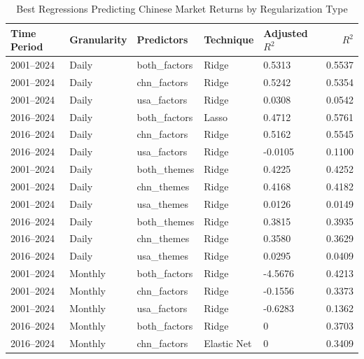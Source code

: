 \begin{table}[htbp]
\centering
\caption{Best Regressions Predicting Chinese Market Returns by Regularization Type}
\label{tab:chn_market_regularized_regression_summary}
\begin{tabular}{@{}lllllr@{}}
\toprule
Time Period & Granularity & Predictors     & Technique & Adjusted $R^2$ & $R^2$ \\ \midrule
2001--2024  & Daily       & both\_factors  & Ridge          & 0.5313         & 0.5537 \\
2001--2024  & Daily       & chn\_factors   & Ridge          & 0.5242         & 0.5354 \\
2001--2024  & Daily       & usa\_factors   & Ridge          & 0.0308         & 0.0542 \\
2016--2024  & Daily       & both\_factors  & Lasso          & 0.4712         & 0.5761 \\
2016--2024  & Daily       & chn\_factors   & Ridge          & 0.5162         & 0.5545 \\
2016--2024  & Daily       & usa\_factors   & Ridge          & -0.0105        & 0.1100 \\
2001--2024  & Daily       & both\_themes   & Ridge          & 0.4225         & 0.4252 \\
2001--2024  & Daily       & chn\_themes    & Ridge          & 0.4168         & 0.4182 \\
2001--2024  & Daily       & usa\_themes    & Ridge          & 0.0126         & 0.0149 \\
2016--2024  & Daily       & both\_themes   & Ridge          & 0.3815         & 0.3935 \\
2016--2024  & Daily       & chn\_themes    & Ridge          & 0.3580         & 0.3629 \\
2016--2024  & Daily       & usa\_themes    & Ridge          & 0.0295         & 0.0409 \\
2001--2024  & Monthly     & both\_factors  & Ridge          & -4.5676        & 0.4213 \\
2001--2024  & Monthly     & chn\_factors   & Ridge          & -0.1556        & 0.3373 \\
2001--2024  & Monthly     & usa\_factors   & Ridge          & -0.6283        & 0.1362 \\
2016--2024  & Monthly     & both\_factors  & Ridge          & 0         & 0.3703 \\
2016--2024  & Monthly     & chn\_factors   & Elastic Net          & 0         & 0.3409 \\

\end{tabular}
\end{table}

